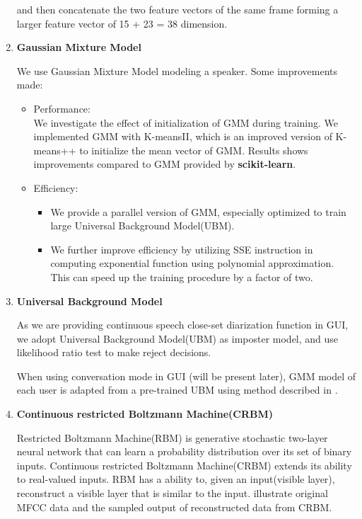 \begin{enumerate}
			and then concatenate the two feature vectors of the same frame forming
			a larger feature vector of 15 + 23 = 38 dimension.

		\item \textbf{Gaussian Mixture Model}

			We use Gaussian Mixture Model modeling a speaker. Some improvements made:
			\begin{itemize}
				\item Performance: \\
					We investigate the effect of initialization of GMM during
					training. We implemented GMM with
					K-meansII\cite{bahmani2012scalable}, which is an improved
					version of K-means++\cite{arthur2007k} to initialize the
					mean vector of GMM. Results shows improvements compared
					to GMM provided by \textbf{scikit-learn\cite{scikit-learn}}.
				\item Efficiency:
					\begin{itemize}
						\item We provide a parallel version of GMM, especially
							optimized to train large Universal Background Model(UBM).
						\item We further improve efficiency by utilizing
							SSE instruction in computing exponential function
							using polynomial approximation. This can speed up
							the training procedure by a factor of two.
					\end{itemize}
                \end{itemize}

		\item \textbf{Universal Background Model}

			As we are providing continuous speech close-set diarization function in
			GUI, we adopt Universal Background Model(UBM) as imposter model,
			and use likelihood ratio test to make reject
			decisions.\cite{reynolds2000speaker}

			When using conversation mode in GUI (will be present later),
			GMM model of each user is adapted from a pre-trained UBM
			using method described in \cite{reynolds2000speaker}.

		\item \textbf{Continuous restricted Boltzmann Machine(CRBM)}

			Restricted Boltzmann Machine(RBM) is generative stochastic
			two-layer neural network that can learn a probability distribution
			over its set of binary inputs\cite{rbm_wiki}.  Continuous
			restricted Boltzmann Machine(CRBM)\cite{chen2003continuous} extends
			its ability to real-valued inputs.  RBM has a ability to, given an
			input(visible layer), reconstruct a visible layer that is similar
			to the input.   illustrate original MFCC data and the
			sampled output of
			reconstructed data from CRBM.


\end{enumerate}
